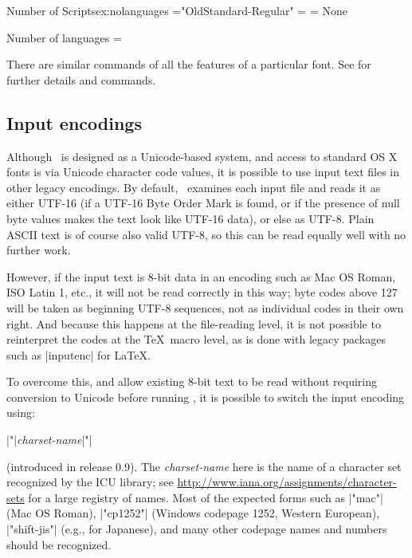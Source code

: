 \begin{texexample}{Number of Scripts}{ex:nolanguages}
\font\testfont="OldStandard-Regular" 
\scripttag=\XeTeXOTscripttag{}
\langcount=\XeTeXOTcountlanguages\testfont\scripttag
\ifnum{} \noindent None\par\fi

Number of languages = \the\langcount
\end{texexample}

There are similar commands of all the features of a particular font.
See \citet{xetexreference} for further details and commands. 

\subsection{Input encodings}
\label{sec:encoding}

Although \XeTeX\ is designed as a Unicode-based system, and access to standard OS X fonts is via Unicode character code values, it is possible to use input text files in other legacy encodings. By default, \XeTeX\ examines each input file and reads it as either UTF-16 (if a UTF-16 Byte Order Mark is found, or if the presence of null byte values makes the text look like UTF-16 data), or else as UTF-8. Plain ASCII text is of course also valid UTF-8, so this can be read equally well with no further work.

However, if the input text is 8-bit data in an encoding such as Mac OS Roman, ISO Latin 1, etc., it will not be read correctly in this way; byte codes above 127 will be taken as beginning UTF-8 sequences, not as individual codes in their own right. And because this happens at the file-reading level, it is not possible to reinterpret the codes at the \TeX\ macro level, as is done with legacy packages such as |inputenc| for \LaTeX.

\CMDI{\XeteXinputencoding}

To overcome this, and allow existing 8-bit text to be read without requiring conversion to Unicode before running \XeTeX, it is possible to switch the input encoding using:
{\obeylines \parskip0pt \parindent
  |\XeTeXinputencoding "|{\em charset-name}|"|\par}\noindent
(introduced in release 0.9). The {\em charset-name} here is the name of a character set recognized by the ICU library; see \url{http://www.iana.org/assignments/character-sets} for a large registry of names. Most of the expected forms such as |"mac"| (Mac OS Roman), |"cp1252"| (Windows codepage 1252, Western European), |"shift-jis"| (e.g., for Japanese), and many other codepage names and numbers should be recognized.

